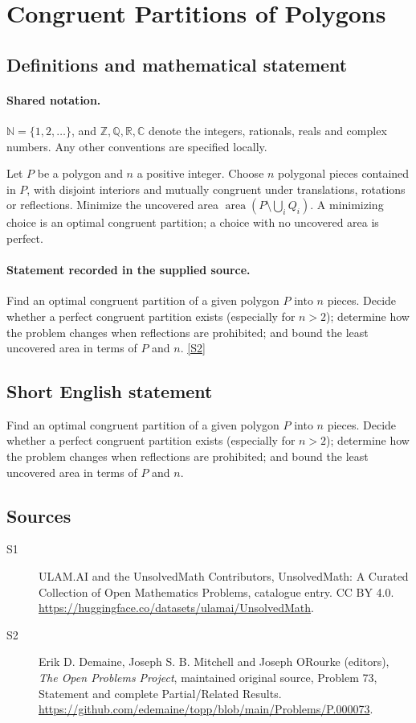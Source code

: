 \documentclass[11pt]{article}
\newcommand{\sref}[2]{\hyperlink{source:#1:#2}{[S#2]}}
\begin{document}
\section{Congruent Partitions of Polygons}\label{statement}

\subsection{Definitions and mathematical statement}

\paragraph{Shared notation.}$\mathbb N=\{1,2,\ldots\}$, and $\mathbb Z,\mathbb Q,\mathbb R,\mathbb C$ denote the integers, rationals, reals and complex numbers. Any other conventions are specified locally.


Let $P$ be a polygon and $n$ a positive integer. Choose $n$ polygonal pieces contained in $P$, with disjoint interiors and mutually congruent under translations, rotations or reflections. Minimize the uncovered area $\operatorname{area}(P\setminus\bigcup_i Q_i)$. A minimizing choice is an optimal congruent partition; a choice with no uncovered area is perfect.
\paragraph{Statement recorded in the supplied source.}
Find an optimal congruent partition of a given polygon $P$ into $n$ pieces. Decide whether a perfect congruent partition exists (especially for $n>2$); determine how the problem changes when reflections are prohibited; and bound the least uncovered area in terms of $P$ and $n$. \sref{statement}{2}
\subsection{Short English statement}
Find an optimal congruent partition of a given polygon $P$ into $n$ pieces. Decide whether a perfect congruent partition exists (especially for $n>2$); determine how the problem changes when reflections are prohibited; and bound the least uncovered area in terms of $P$ and $n$.
\subsection{Sources}
\begin{description}
\item[\hypertarget{source:statement:1}{S1}] ULAM.AI and the UnsolvedMath Contributors, UnsolvedMath: A Curated Collection of Open Mathematics Problems, catalogue entry. CC BY 4.0. \url{https://huggingface.co/datasets/ulamai/UnsolvedMath}.
\item[\hypertarget{source:statement:2}{S2}] Erik D. Demaine, Joseph S. B. Mitchell and Joseph O\textquotesingle Rourke (editors), \emph{The Open Problems Project}, maintained original source, Problem 73, Statement and complete Partial/Related Results. \url{https://github.com/edemaine/topp/blob/main/Problems/P.000073}.
\end{description}
\label{end:statement}
\end{document}
